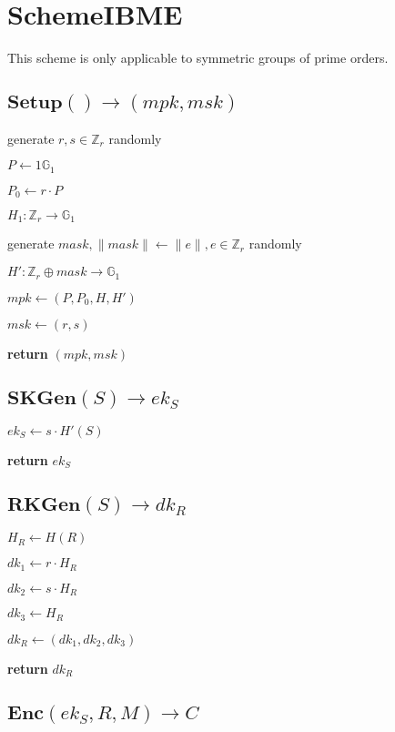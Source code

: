 \documentclass[a4paper]{article}
\begin{document}
\section{SchemeIBME}

This scheme is only applicable to symmetric groups of prime orders. 

\subsection{$\textbf{Setup}() \rightarrow (\textit{mpk}, \textit{msk})$}

generate $r, s \in \mathbb{Z}_r$ randomly

$P \gets 1{\mathbb{G}_1}$

$P_0 \gets r \cdot P$

$H_1: \mathbb{Z}_r \rightarrow \mathbb{G}_1$

generate $\textit{mask}, \|\textit{mask}\| \gets \|e\|, e \in \mathbb{Z}_r$ randomly

$H': \mathbb{Z}_r \oplus \textit{mask} \rightarrow \mathbb{G}_1$

$\textit{mpk} \gets (P, P_0, H, H')$

$\textit{msk} \gets (r, s)$

\textbf{return} $(\textit{mpk}, \textit{msk})$

\subsection{$\textbf{SKGen}(S) \rightarrow \textit{ek}_S$}

$\textit{ek}_S \gets s \cdot H'(S)$

\textbf{return} $\textit{ek}_S$

\subsection{$\textbf{RKGen}(S) \rightarrow \textit{dk}_R$}

$H_R \gets H(R)$

$\textit{dk}_1 \gets r \cdot H_R$

$\textit{dk}_2 \gets s \cdot H_R$

$\textit{dk}_3 \gets H_R$

$\textit{dk}_R \gets (\textit{dk}_1, \textit{dk}_2, \textit{dk}_3)$

\textbf{return} $\textit{dk}_R$

\subsection{$\textbf{Enc}(\textit{ek}_S, R, M) \rightarrow C$}
\end{document}
